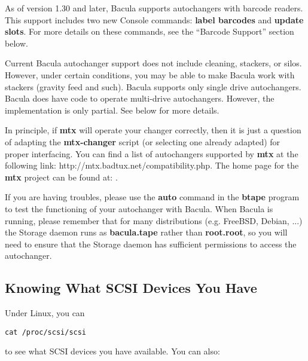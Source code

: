 As of version 1.30 and later, Bacula supports autochangers with barcode
readers. This support includes two new Console commands: {\bf label barcodes}
and {\bf update slots}. For more details on these commands, see the ``Barcode
Support'' section below. 

Current Bacula autochanger support does not include cleaning, stackers, or
silos. However, under certain conditions, you may be able to make Bacula work
with stackers (gravity feed and such). Bacula supports only single drive
autochangers. Bacula does have code to operate multi-drive autochangers.
However, the implementation is only partial. See below for more details. 

In principle, if {\bf mtx} will operate your changer correctly, then it is
just a question of adapting the {\bf mtx-changer} script (or selecting one
already adapted) for proper interfacing. You can find a list of autochangers
supported by {\bf mtx} at the following link: 
{http://mtx.badtux.net/compatibility.php}.
The home page for the {\bf mtx} project can be found at: 
. 

If you are having troubles, please use the {\bf auto} command in the {\bf
btape} program to test the functioning of your autochanger with Bacula. When
Bacula is running, please remember that for many distributions (e.g. FreeBSD,
Debian, ...) the Storage daemon runs as {\bf bacula.tape} rather than {\bf
root.root}, so you will need to ensure that the Storage daemon has sufficient
permissions to access the autochanger. 

\label{SCSI devices}

\subsection*{Knowing What SCSI Devices You Have}

Under Linux, you can 

\footnotesize
\begin{verbatim}
cat /proc/scsi/scsi
\end{verbatim}
\normalsize

to see what SCSI devices you have available. You can also: 

